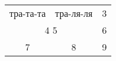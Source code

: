 \documentclass[11pt]{report}
\begin{document}
	\begin{tabular}{||c|c|c||}
		\hline тра-та-та & тра-ля-ля & 3\\ \cline{1-2}

		\multicolumn{2}{|c|}{4  5} & 6\\
		\hline
		7 & 8 & 9\\
		\hline
	\end{tabular}
\end{document}
